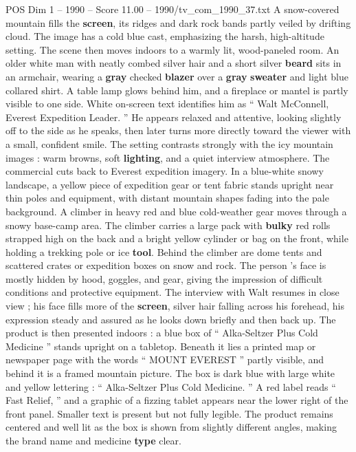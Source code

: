 \begin{textsample}{POS Dim 1 – 1990 – Score 11.00 – 1990/tv\_com\_1990\_37.txt}  \label{ex:f1_pos_041}
A snow-covered mountain fills the \textbf{screen}, its ridges and dark rock bands partly veiled by drifting cloud.
The image has a cold blue cast, emphasizing the harsh, high-altitude setting.
The scene then moves indoors to a warmly lit, wood-paneled room.
An older white man with neatly combed silver hair and a short silver \textbf{beard} sits in an armchair, wearing a \textbf{gray} checked \textbf{blazer} over a \textbf{gray} \textbf{sweater} and light blue collared shirt.
A table lamp glows behind him, and a fireplace or mantel is partly visible to one side.
White on-screen text identifies him as “ Walt McConnell, Everest Expedition Leader. ” He appears relaxed and attentive, looking slightly off to the side as he speaks, then later turns more directly toward the viewer with a small, confident smile.
The setting contrasts strongly with the icy mountain images : warm browns, soft \textbf{lighting}, and a quiet interview atmosphere.
The commercial cuts back to Everest expedition imagery.
In a blue-white snowy landscape, a yellow piece of expedition gear or tent fabric stands upright near thin poles and equipment, with distant mountain shapes fading into the pale background.
A climber in heavy red and blue cold-weather gear moves through a snowy base-camp area.
The climber carries a large pack with \textbf{bulky} red rolls strapped high on the back and a bright yellow cylinder or bag on the front, while holding a trekking pole or ice \textbf{tool}.
Behind the climber are dome tents and scattered crates or expedition boxes on snow and rock.
The person ’s face is mostly hidden by hood, goggles, and gear, giving the impression of difficult conditions and protective equipment.
The interview with Walt resumes in close view ; his face fills more of the \textbf{screen}, silver hair falling across his forehead, his expression steady and assured as he looks down briefly and then back up.
The product is then presented indoors : a blue box of “ Alka-Seltzer Plus Cold Medicine ” stands upright on a tabletop.
Beneath it lies a printed map or newspaper page with the words “ MOUNT EVEREST ” partly visible, and behind it is a framed mountain picture.
The box is dark blue with large white and yellow lettering : “ Alka-Seltzer Plus Cold Medicine. ” A red label reads “ Fast Relief, ” and a graphic of a fizzing tablet appears near the lower right of the front panel.
Smaller text is present but not fully legible.
The product remains centered and well lit as the box is shown from slightly different angles, making the brand name and medicine \textbf{type} clear.

\end{textsample}
